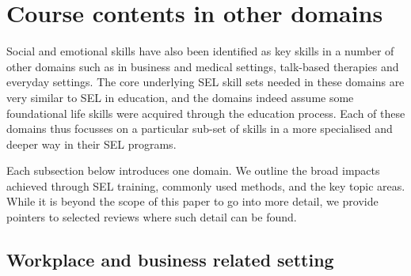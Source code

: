 \documentclass[prodmode,acmtochi]{acmsmall}
\newcommand{\todo}[1]{\textrm{\textrm{\textcolor{LightBlue}{[[#1]]}}}}
\begin{document}
%
        




\section{Course contents in other domains}
\label{sec:linkDomains}
Social
and emotional skills have also been identified as key skills in a number of other domains such as in business and medical settings, talk-based therapies and everyday settings. The core underlying SEL skill sets needed in these domains are very similar to SEL in education, and the domains indeed assume some foundational life skills were acquired through the education process. Each of these domains thus focusses on a particular sub-set of skills in a more specialised and deeper way in their SEL programs. %

Each subsection below introduces one domain. We outline the broad impacts achieved through SEL training, commonly used methods, and the key topic areas. While it is beyond the scope of this paper to go into more detail, we provide pointers to selected reviews where such detail can be found.
 
  

\subsection{Workplace and business related setting}
\end{document}
